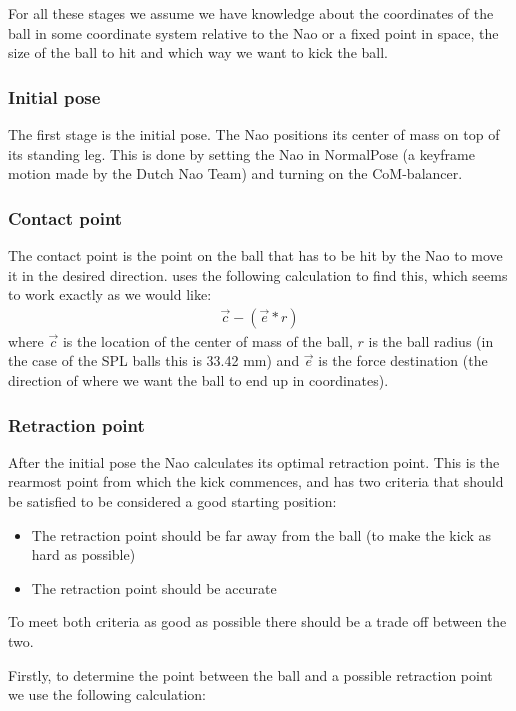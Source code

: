 \documentclass[a4paper]{article}
\begin{document}
For all these stages we assume we have knowledge about the coordinates of the
ball in some coordinate system relative to the Nao or a fixed point in space,
the size of the ball to hit and which way we want to kick the ball.

\subsubsection{Initial pose}
The first stage is the initial pose. The Nao positions its center of mass on
top of its standing leg. This is done by setting the Nao in NormalPose (a
keyframe motion made by the Dutch Nao Team) and
turning on the CoM-balancer.

\subsubsection{Contact point}
The contact point is the point on the ball that has to be hit by the Nao to
move it in the desired direction. \cite{Xu2010} uses the following
calculation to find this, which seems to work exactly as we would like:
\begin{align*}
    \vec{c} - ( \vec{e} * r )
\end{align*}
where $\vec{c}$ is the location of the center of mass of the ball, $r$ is the
ball radius (in the case of the SPL balls this is 33.42 mm) and $\vec{e}$ is the
force destination (the direction of where we want the ball to end up in
coordinates). 


\subsubsection{Retraction point}
After the initial pose the Nao calculates its optimal retraction point. This
is the rearmost point from which the kick commences, and has two criteria that
should be satisfied to be considered a good starting position:
\begin{itemize}
    \item The retraction point should be far away from the ball (to make the
        kick as hard as possible)
    \item The retraction point should be accurate 
\end{itemize}
To meet both criteria as good as possible there should be a trade off between
the two.

Firstly, to determine the point between the ball and a possible retraction point
we use the following calculation: 
\end{document}
